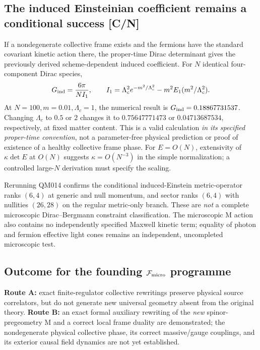 \documentclass[11pt,a4paper]{article}
\begin{document}
\subsection{The induced Einsteinian coefficient remains a conditional success [C/N]}
\label{sec:v14-Gind}
If a nondegenerate collective frame exists and the fermions have the standard covariant kinetic action there, the proper-time Dirac determinant gives the previously derived scheme-dependent induced coefficient. For $N$ identical four-component Dirac species,
\begin{equation}\label{eq:v14-Gind}
G_{\rm ind}=\frac{6\pi}{NI_1},\qquad
I_1=\Lambda_c^2e^{-m^2/\Lambda_c^2}-m^2E_1(m^2/\Lambda_c^2).
\end{equation}
At $N=100,m=0.01,\Lambda_c=1$, the numerical result is $G_{\rm ind}=0.18867731537$. Changing $\Lambda_c$ to $0.5$ or $2$ changes it to $0.75647771473$ or $0.04713687534$, respectively, at fixed matter content. This is a valid calculation \emph{in its specified proper-time convention}, not a parameter-free physical prediction or proof of existence of a healthy collective frame phase. For $E=O(N)$, extensivity of $\kappa\det E$ at $O(N)$ suggests $\kappa=O(N^{-3})$ in the simple normalization; a controlled large-$N$ derivation must specify the scaling.

Rerunning QM014 confirms the conditional induced-Einstein metric-operator ranks $(6,4)$ at generic and null momentum, and sector ranks $(6,4)$ with nullities $(26,28)$ on the regular metric-only branch. These are \emph{not} a complete microscopic Dirac--Bergmann constraint classification. The microscopic M action also contains no independently specified Maxwell kinetic term; equality of photon and fermion effective light cones remains an independent, uncompleted microscopic test.

\subsection{Outcome for the founding $\mathcal F_{\rm micro}$ programme}
\label{sec:v14-conclusion}
\textbf{Route A:} exact finite-regulator collective rewritings preserve physical source correlators, but do not generate new universal geometry absent from the original theory. \textbf{Route B:} an exact formal auxiliary rewriting of the \emph{new} spinor-pregeometry M and a correct local frame duality are demonstrated; the nondegenerate physical collective phase, its correct massive/gauge couplings, and its exterior causal field dynamics are not yet established.
\end{document}
